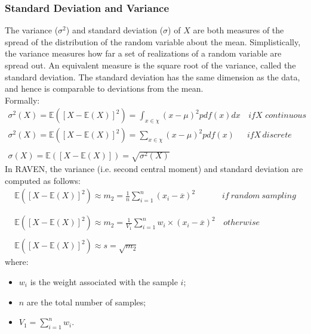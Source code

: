 \subsubsection{Standard Deviation and Variance}
The variance ($\sigma^{2}$) and standard deviation ($\sigma$) of $X$ are both measures of the spread of the distribution of the random variable about the 
mean. Simplistically, the variance measures how far a set of realizations of a random variable are spread out.
An equivalent measure is the square root of the variance, called the standard deviation. The standard deviation has the same dimension as the data, and hence is comparable to deviations from the mean.
\\Formally:
\begin{equation}
  \begin{matrix}
  \sigma^{2}(X)= \mathbb{E}\left(\left[X - \mathbb{E}(X)\right]^{2}\right) = \int_{x \in \chi} (x - \mu)^2 pdf(x) dx  & \, if X \, \, continuous \\
  \sigma^{2}(X)= \mathbb{E}\left(\left[X - \mathbb{E}(X)\right]^{2}\right)  = \sum_{x \in \chi} (x - \mu)^2 pdf(x)  & if X \, discrete
  \\
  \\ 
  \sigma(X)= \mathbb{E}\left(\left[X - \mathbb{E}(X)\right]\right)  = \sqrt{\sigma^{2}(X)}
  \end{matrix}
\end{equation}
In RAVEN, the variance (i.e. second central moment) and standard deviation are computed as follows:
\begin{equation}
\begin{matrix}
\mathbb{E}\left(\left[X - \mathbb{E}(X)\right]^{2}\right)  \approx  m_{2} = \frac{1}{n} \sum_{i=1}^{n}  (x_{i} - \overline{x})^{2} & if \: random \: sampling \\ 
\\ 
\\
\mathbb{E}\left(\left[X - \mathbb{E}(X)\right]^{2}\right)  \approx m_{2}  = \frac{1}{V_{1}} \sum_{i=1}^{n} w_{i} \times (x_{i} - \overline{x})^{2}  & \, otherwise
\\
\\
\mathbb{E}\left(\left[X - \mathbb{E}(X)\right]^{2}\right)  \approx s  =  \sqrt{m_{2}}
\end{matrix}
\end{equation}
where:
\begin{itemize}
  \item $w_{i}$ is the weight associated with the sample $i$;
  \item $n$ are the total number of samples;
  \item $V_{1} = \sum_{i=1}^{n} w_{i}$.
\end{itemize}
